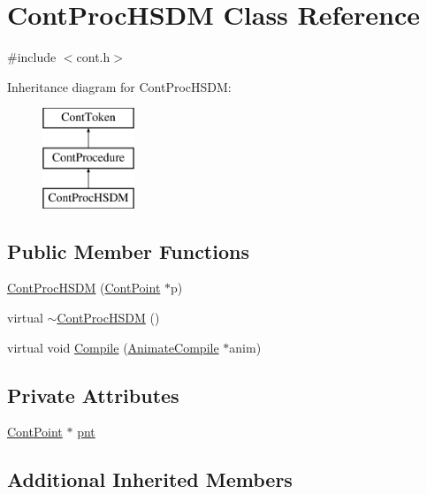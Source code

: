 \hypertarget{a00075}{\section{Cont\-Proc\-H\-S\-D\-M Class Reference}
\label{a00075}
}


{\ttfamily \#include $<$cont.\-h$>$}

Inheritance diagram for Cont\-Proc\-H\-S\-D\-M\-:\begin{figure}[H]
\begin{center}
\leavevmode
\includegraphics[height=3.000000cm]{a00075}
\end{center}
\end{figure}
\subsection*{Public Member Functions}
\begin{DoxyCompactItemize}
\item 
\hyperlink{a00075_a90435f0789c5ff5b4b50761429f67958}{Cont\-Proc\-H\-S\-D\-M} (\hyperlink{a00062}{Cont\-Point} $\ast$p)
\item 
virtual \hyperlink{a00075_a77a51089e8747a6c0edfb46c1d060771}{$\sim$\-Cont\-Proc\-H\-S\-D\-M} ()
\item 
virtual void \hyperlink{a00075_acee31da94d32070ac68d5929c35851b4}{Compile} (\hyperlink{a00007}{Animate\-Compile} $\ast$anim)
\end{DoxyCompactItemize}
\subsection*{Private Attributes}
\begin{DoxyCompactItemize}
\item 
\hyperlink{a00062}{Cont\-Point} $\ast$ \hyperlink{a00075_a772b7e6f6be9a1983232f3a43ca75f75}{pnt}
\end{DoxyCompactItemize}
\subsection*{Additional Inherited Members}


